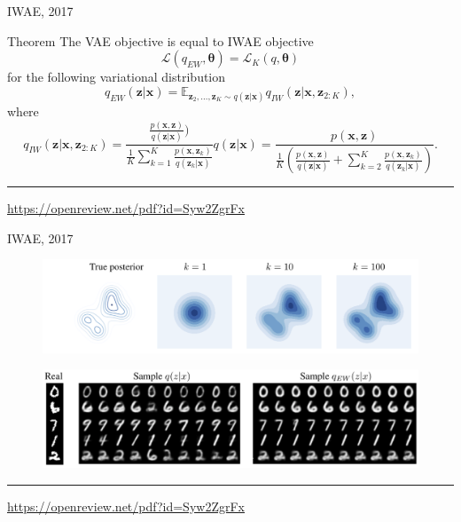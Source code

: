 \documentclass{beamer}
\newcommand{\bx}{\mathbf{x}}
\newcommand{\bz}{\mathbf{z}}
\newcommand{\btheta}{\boldsymbol{\theta}}
\begin{document}
\begin{frame}{IWAE, 2017}
\begin{block}{Theorem}
	The VAE objective is equal to IWAE objective 
	\[
	\mathcal{L}(q_{EW}, \btheta) = \mathcal{L}_K(q, \btheta)
	\]
	for the following variational distribution
	\[
	q_{EW}(\bz | \bx) = \mathbb{E}_{\bz_2, \dots, \bz_K \sim q(\bz | \bx)} q_{IW}(\bz | \bx, \bz_{2:K}),
	\]
	where \[
	q_{IW}(\bz | \bx, \bz_{2:K}) = \frac{\frac{p(\bx, \bz)}{q(\bz | \bx)})}{\frac{1}{K} \sum_{k=1}^K \frac{p(\bx, \bz_k)}{q(\bz_k | \bx)}} q(\bz | \bx) = \frac{p(\bx, \bz)}{\frac{1}{K}\left( \frac{p(\bx, \bz)}{q(\bz | \bx)} + \sum_{k=2}^K \frac{p(\bx, \bz_k)}{q(\bz_k | \bx)}\right)}.
	\]
\end{block}

\vfill
\hrule\medskip
{\scriptsize \href{https://openreview.net/pdf?id=Syw2ZgrFx}{https://openreview.net/pdf?id=Syw2ZgrFx}}
\end{frame}
\begin{frame}{IWAE, 2017}
\begin{figure}
	\centering
	\includegraphics[width=\linewidth]{figs/IWAE_1.png}
\end{figure}
\begin{figure}
	\centering
	\includegraphics[width=\linewidth]{figs/IWAE_2.png}
\end{figure}

\vfill
\hrule\medskip
{\scriptsize \href{https://openreview.net/pdf?id=Syw2ZgrFx}{https://openreview.net/pdf?id=Syw2ZgrFx}}
\end{frame}
\end{document}
